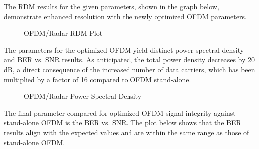 \documentclass[conference]{IEEEtran}
\begin{document}
The RDM results for the given parameters, shown in the graph below, demonstrate enhanced resolution with the newly optimized OFDM parameters.

\begin{figure}[H]
\centering
{}
\caption{OFDM/Radar RDM Plot}
\end{figure} 

The parameters for the optimized OFDM yield distinct power spectral density and BER vs. SNR results. As anticipated, the total power density decreases by 20 dB, a direct consequence of the increased number of data carriers, which has been multiplied by a factor of 16 compared to OFDM stand-alone.

\begin{figure}[H]
\centering
{}
\caption{OFDM/Radar Power Spectral Density}
\end{figure} 

The final parameter compared for optimized OFDM signal integrity against stand-alone OFDM is the BER vs. SNR. The plot below shows that the BER results align with the expected values and are within the same range as those of stand-alone OFDM.
\end{document}
